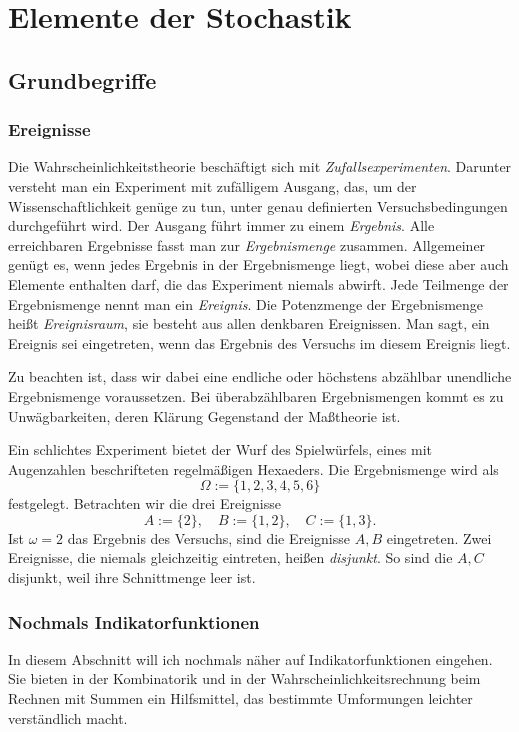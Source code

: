 
\chapter{Elemente der Stochastik}

\section{Grundbegriffe}

\subsection{Ereignisse}

Die Wahrscheinlichkeitstheorie beschäftigt sich mit
\emph{Zufallsexperimenten}. Darunter versteht man ein Experiment
mit zufälligem Ausgang, das, um der Wissenschaftlichkeit genüge zu tun,
unter genau definierten Versuchsbedingungen durchgeführt wird.
Der Ausgang führt immer zu einem \emph{Ergebnis}. Alle erreichbaren
Ergebnisse fasst man zur \emph{Ergebnismenge} zusammen. Allgemeiner
genügt es, wenn jedes Ergebnis in der Ergebnismenge liegt, wobei diese
aber auch Elemente enthalten darf, die das Experiment niemals abwirft.
Jede Teilmenge der Ergebnismenge nennt man ein \emph{Ereignis}.
Die Potenzmenge der Ergebnismenge heißt \emph{Ereignisraum}, sie
besteht aus allen denkbaren Ereignissen. Man sagt, ein Ereignis sei
eingetreten, wenn das Ergebnis des Versuchs im diesem Ereignis liegt.

Zu beachten ist, dass wir dabei eine endliche oder höchstens
abzählbar unendliche Ergebnismenge voraussetzen. Bei überabzählbaren
Ergebnismengen kommt es zu Unwägbarkeiten, deren Klärung Gegenstand der
Maßtheorie ist.

Ein schlichtes Experiment bietet der Wurf des Spielwürfels, eines mit
Augenzahlen beschrifteten regelmäßigen Hexaeders. Die Ergebnismenge
wird als
\[\Omega := \{1, 2, 3, 4, 5, 6\}\]
festgelegt. Betrachten wir die drei Ereignisse
\[A := \{2\},\quad B := \{1,2\},\quad C:=\{1,3\}.\]
Ist $\omega=2$ das Ergebnis des Versuchs, sind die Ereignisse $A,B$
eingetreten. Zwei Ereignisse, die niemals gleichzeitig eintreten,
heißen \emph{disjunkt}. So sind die $A,C$ disjunkt, weil ihre
Schnittmenge leer ist.

\subsection{Nochmals Indikatorfunktionen}

In diesem Abschnitt will ich nochmals näher auf Indikatorfunktionen%
 eingehen. Sie bieten in der Kombinatorik und
in der Wahrscheinlichkeitsrechnung beim Rechnen mit Summen ein Hilfsmittel,
das bestimmte Umformungen leichter verständlich macht.

